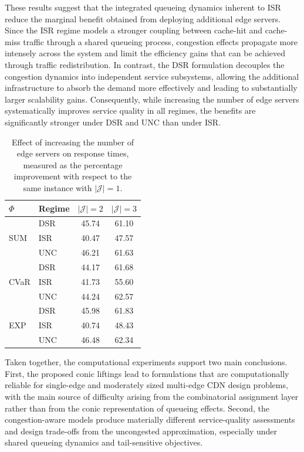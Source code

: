 \documentclass[a4paper,11pt,reqno]{amsart}
\newcommand{\J}{\mathcal{J}}
\begin{document}
These results suggest that the integrated queueing dynamics inherent to ISR reduce the marginal benefit obtained from deploying additional edge servers. Since the ISR regime models a stronger coupling between cache-hit and cache-miss traffic through a shared queueing process, congestion effects propagate more intensely across the system and limit the efficiency gains that can be achieved through traffic redistribution. In contrast, the DSR formulation decouples the congestion dynamics into independent service subsystems, allowing the additional infrastructure to absorb the demand more effectively and leading to substantially larger scalability gains. Consequently, while increasing the number of edge servers systematically improves service quality in all regimes, the benefits are significantly stronger under DSR and UNC than under ISR.
\begin{table}[ht]
\centering
\renewcommand{\arraystretch}{0.95}

\begin{tabular}{llcc}
\toprule
$\Phi$ & Regime
& $|\J|=2$ & $|\J|=3$ \\
\midrule
\multirow{3}{*}{SUM} & DSR & 45.74 & 61.10 \\
& ISR & 40.47 & 47.57 \\
 & UNC & 46.21 & 61.63 \\\midrule
\multirow{3}{*}{CVaR} & DSR & 44.17 & 61.68 \\
 & ISR & 41.73 & 55.60 \\
 & UNC & 44.24 & 62.57 \\\midrule
\multirow{3}{*}{EXP} & DSR & 45.98 & 61.83 \\
 & ISR & 40.74 & 48.43 \\
 & UNC & 46.48 & 62.34 \\
\bottomrule
\end{tabular}
\caption{Effect of increasing the number of edge servers on response times, measured as the percentage improvement with respect to the same instance with $|\J|=1$.}
\label{tab:p_effect_response_times}
\end{table}
Taken together, the computational experiments support two main conclusions. First, the proposed conic liftings lead to formulations that are computationally reliable for single-edge and moderately sized multi-edge CDN design problems, with the main source of difficulty arising from the combinatorial assignment layer rather than from the conic representation of queueing effects. Second, the congestion-aware models produce materially different service-quality assessments and design trade-offs from the uncongested approximation, especially under shared queueing dynamics and tail-sensitive objectives.
\end{document}
